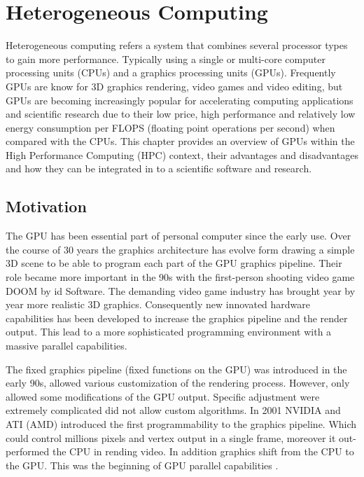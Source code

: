 

\chapter{Heterogeneous Computing} %

\label{Heterogeneous Computing} %


Heterogeneous computing refers a system that combines several processor types to gain more performance. Typically using a single or multi-core computer processing units (CPUs) and a  graphics processing units (GPUs).
Frequently GPUs are know for 3D graphics rendering, video games and video editing, but GPUs are becoming increasingly popular for accelerating computing applications and scientific research due to their low price, high performance and relatively low energy consumption per FLOPS (floating point operations per second) when compared with the CPUs. This chapter provides an overview of GPUs within the High Performance Computing (HPC) context, their advantages and disadvantages and how they can be integrated in to a scientific software and research.



\section{Motivation}

The GPU has been essential part of personal computer since the early use. Over the course of 30 years the graphics architecture has evolve form drawing a simple 3D scene to be able to program each part of the GPU graphics pipeline. Their role became more important in the 90s with the first-person shooting video game DOOM by id Software. The demanding video game industry has brought year by year more realistic 3D graphics. Consequently new innovated hardware capabilities has been developed to increase the graphics pipeline and the render output. This lead to a more sophisticated programming environment with a massive parallel capabilities.

The fixed graphics pipeline (fixed functions on the GPU) was introduced in the early 90s, allowed various customization of the rendering process. However, only allowed some modifications of the GPU output. Specific adjustment were extremely complicated did not allow custom algorithms. In 2001 NVIDIA and ATI (AMD) introduced the first programmability to the graphics pipeline. Which could control millions pixels and vertex output in a single frame, moreover it out-performed the CPU in rending video. In addition graphics shift from the CPU to the GPU. This was the beginning of GPU parallel capabilities \cite{Nickolls}.

